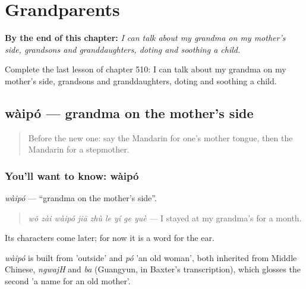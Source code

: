 
\chapter{Grandparents}
\label{ch:zh-grandparents}

\begin{chapteropening}
\textbf{By the end of this chapter:} \emph{I can talk about my grandma on my mother's side, grandsons and granddaughters, doting and soothing a child.}

Complete the last lesson of chapter 510: I can talk about my grandma on my mother's side, grandsons and granddaughters, doting and soothing a child.
\end{chapteropening}

\section[wàipó]{wàipó — grandma on the mother's side}

\label{lesson:ZH-C510-waipo}



\begin{quote}
Before the new one: say the Mandarin for one's mother tongue, then the Mandarin for a stepmother.
\end{quote}

\subsection*{You'll want to know: wàipó}
\emph{wàipó} — \textquotedblleft{}grandma on the mother's side\textquotedblright{}.

\begin{quote}
\emph{wǒ zài wàipó jiā zhù le yí ge yuè} — I stayed at my grandma's for a month.
\end{quote}

Its characters come later; for now it is a word for the ear.

\begin{cousinweb}
\emph{wàipó} is built from  'outside' and \emph{pó} 'an old woman', both inherited from Middle Chinese, \emph{ngwajH} and \emph{ba} (Guangyun, in Baxter's transcription), which glosses the second 'a name for an old mother'.
\end{cousinweb}

